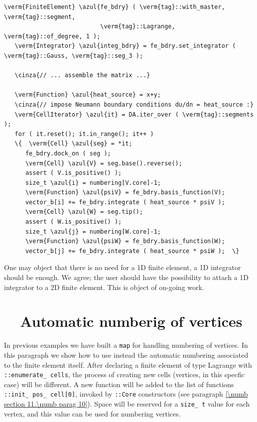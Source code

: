 \begin{Verbatim}[commandchars=\\\{\},formatcom=\small\tt,frame=single,
   label=parag-\ref{\numb section 6.\numb parag 3}.cpp,rulecolor=\color{coment},
   baselinestretch=0.94,framesep=2mm                                            ]
   \verm{FiniteElement} \azul{fe_bdry} ( \verm{tag}::with_master, \verm{tag}::segment,
                           \verm{tag}::Lagrange, \verm{tag}::of_degree, 1 );
   \verm{Integrator} \azul{integ_bdry} = fe_bdry.set_integrator ( \verm{tag}::Gauss, \verm{tag}::seg_3 );

   \cinza{// ... assemble the matrix ...}

   \verm{Function} \azul{heat_source} = x+y;
   \cinza{// impose Neumann boundary conditions du/dn = heat_source :}
   \verm{CellIterator} \azul{it} = DA.iter_over ( \verm{tag}::segments );
   for ( it.reset(); it.in_range(); it++ )
   \{  \verm{Cell} \azul{seg} = *it;
      fe_bdry.dock_on ( seg );
      \verm{Cell} \azul{V} = seg.base().reverse();
      assert ( V.is_positive() );
      size_t \azul{i} = numbering[V.core]-1;
      \verm{Function} \azul{psiV} = fe_bdry.basis_function(V);
      vector_b[i] += fe_bdry.integrate ( heat_source * psiV );
      \verm{Cell} \azul{W} = seg.tip();
      assert ( W.is_positive() );
      size_t \azul{j} = numbering[W.core]-1;
      \verm{Function} \azul{psiW} = fe_bdry.basis_function(W);
      vector_b[j] += fe_bdry.integrate ( heat_source * psiW );  \}
\end{Verbatim}

One may object that there is no need for a 1D finite element, a 1D integrator should be enough.
We agree; the user should have the possibility to attach a 1D integrator to a 2D finite element.
This is object of on-going work.


\section{~~Automatic numberig of vertices}\label{\numb section 6.\numb parag 4}

In previous examples we have built a {\small\tt map} for handling numbering of vertices.
In this paragraph we show how to use instead the automatic numbering associated to the
finite element itself.
After declaring a finite element of type Lagrange with {\small\tt{}::enumerate\_\,cells},
the process of creating new cells (vertices, in this specfic case) will be different.
A new function will be added to the list of functions {\small\tt{}::init\_\,pos\_\,cell[0]},
invoked by {\small\tt{}::Core} constructors (see paragraph
\ref{\numb section 11.\numb parag 10}).
Space will be reserved for a {\small\tt size\_\,t} value for each vertex, and
this value can be used for numbering vertices.

